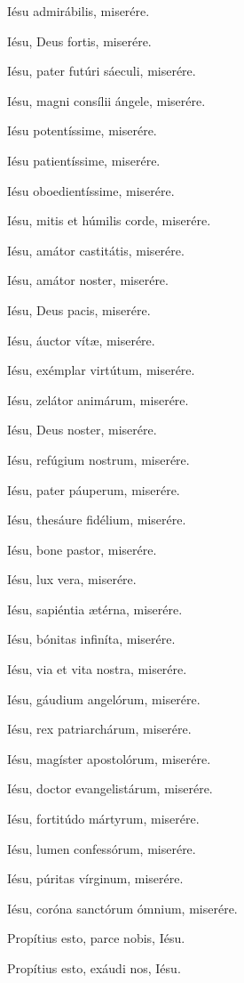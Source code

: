\documentclass[12pt,a6paper]{book}
\begin{document}
\begin{sloppy}
Iésu admirábilis, miserére.

Iésu, Deus fortis, miserére.

Iésu, pater futúri sáeculi, miserére.

Iésu, magni consílii ángele, miserére.

Iésu potentíssime, miserére.

Iésu patientíssime, miserére.

Iésu oboedientíssime, miserére.

Iésu, mitis et húmilis corde, miserére.

Iésu, amátor castitátis, miserére.

Iésu, amátor noster, miserére.

Iésu, Deus pacis, miserére.

Iésu, áuctor vítæ, miserére.

Iésu, exémplar virtútum, miserére.

Iésu, zelátor animárum, miserére.

Iésu, Deus noster, miserére.

Iésu, refúgium nostrum, miserére.

Iésu, pater páuperum, miserére.

Iésu, thesáure fidélium, miserére.

Iésu, bone pastor, miserére.

Iésu, lux vera, miserére.

Iésu, sapiéntia ætérna, miserére.

Iésu, bónitas infiníta, miserére.

Iésu, via et vita nostra, miserére.

Iésu, gáudium angelórum, miserére.

Iésu, rex patriarchárum, miserére.

Iésu, magíster apostolórum, miserére.

Iésu, doctor evangelistárum, miserére.

Iésu, fortitúdo mártyrum, miserére.

Iésu, lumen confessórum, miserére.

Iésu, púritas vírginum, miserére.

Iésu, coróna sanctórum ómnium, miserére.

\vspace{3mm}

Propítius esto, parce nobis, Iésu.

Propítius esto, exáudi nos, Iésu.

\vspace{3mm}


\end{sloppy}
\end{document}
